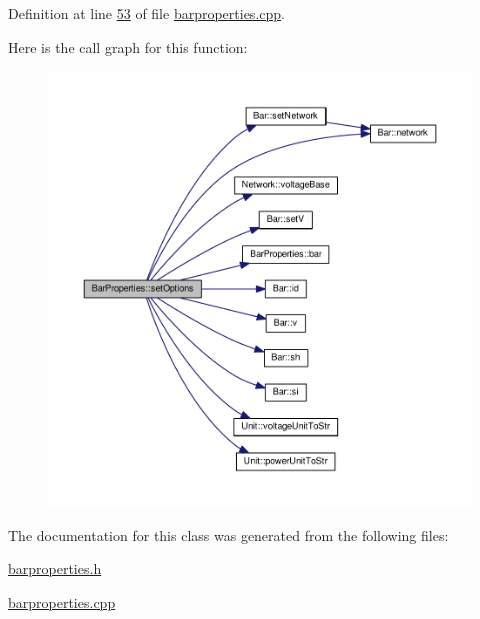 Definition at line \hyperlink{barproperties_8cpp_source_l00053}{53} of file \hyperlink{barproperties_8cpp_source}{barproperties.\+cpp}.



Here is the call graph for this function\+:
\nopagebreak
\begin{figure}[H]
\begin{center}
\leavevmode
\includegraphics[width=350pt]{class_bar_properties_a0a9a2284b5aad8acbade86ccec7adbf8_cgraph}
\end{center}
\end{figure}




The documentation for this class was generated from the following files\+:\begin{DoxyCompactItemize}
\item 
\hyperlink{barproperties_8h}{barproperties.\+h}\item 
\hyperlink{barproperties_8cpp}{barproperties.\+cpp}\end{DoxyCompactItemize}
